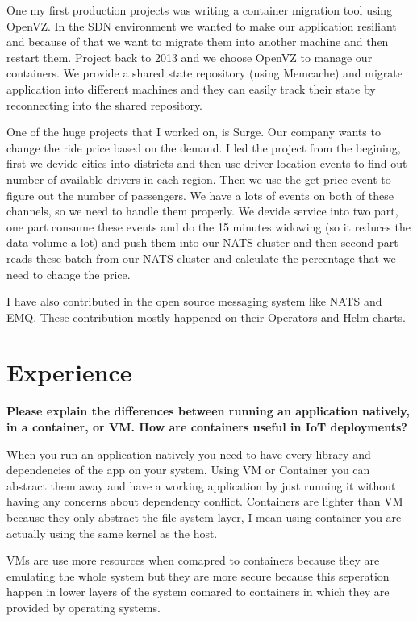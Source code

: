 One my first production projects was writing a container migration tool using OpenVZ. In the SDN environment we wanted
to make our application resiliant and because of that we want to migrate them into another machine and then restart them.
Project back to 2013 and we choose OpenVZ to manage our containers. We provide a shared state repository (using Memcache)
and migrate application into different machines and they can easily track their state by reconnecting into the shared
repository.

One of the huge projects that I worked on, is Surge. Our company wants to change the ride price based on the demand.
I led the project from the begining, first we devide cities into districts and then use driver location events to find
out number of available drivers in each region. Then we use the get price event to figure out the number of passengers.
We have a lots of events on both of these channels, so we need to handle them properly. We devide service into two part,
one part consume these events and do the 15 minutes widowing (so it reduces the data volume a lot) and
push them into our NATS cluster and then second part reads these batch from our NATS cluster and calculate
the percentage that we need to change the price.

I have also contributed in the open source messaging system like NATS and EMQ. These contribution mostly happened
on their Operators and Helm charts.

\section{Experience}

\noindent
\textbf{Please explain the differences between running an application natively, in a container, or VM.
How are containers useful in IoT deployments?}

When you run an application natively you need to have every library and dependencies of the app on your system.
Using VM or Container you can abstract them away and have a working application by just running it without
having any concerns about dependency conflict.
Containers are lighter than VM because they only abstract the file system layer, I mean using container
you are actually using the same kernel as the host.

VMs are use more resources when comapred to containers because they are emulating the whole system but they are
more secure because this seperation happen in lower layers of the system comared to containers in which they
are provided by operating systems.

